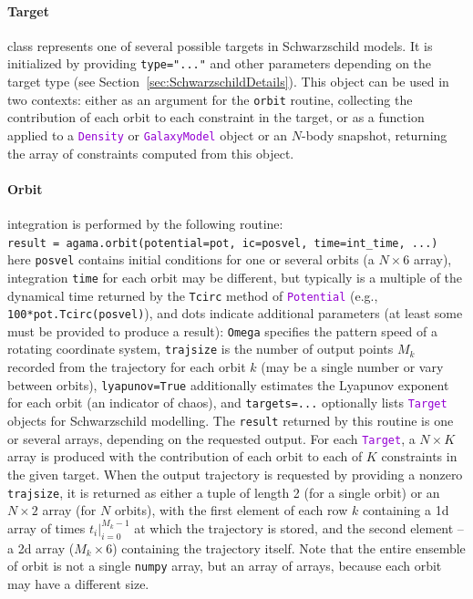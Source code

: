 \documentclass[12pt]{article}
\newcommand{\ttt}[1]{\textcolor{darkviolet}{\texttt{#1}}}
\newcommand{\ppp}[1]{\textcolor{darkolive} {\texttt{#1}}}
\begin{document}
\paragraph{Target} class represents one of several possible targets in Schwarzschild models. It is initialized by providing \ppp{type="..."} and other parameters depending on the target type (see Section~\ref{sec:SchwarzschildDetails}). This object can be used in two contexts: either as an argument for the \texttt{orbit} routine, collecting the contribution of each orbit to each constraint in the target, or as a function applied to a \ttt{Density} or \ttt{GalaxyModel} object or an $N$-body snapshot, returning the array of constraints computed from this object.

\paragraph{Orbit} integration is performed by the following routine:\\
\texttt{result = agama.orbit(potential=pot, ic=posvel, time=int_time, ...)}\\
here \ppp{posvel} contains initial conditions for one or several orbits (a $N\times6$ array), integration \ppp{time} for each orbit may be different, but typically is a multiple of the dynamical time returned by the \texttt{Tcirc} method of \ttt{Potential} (e.g., \texttt{100*pot.Tcirc(posvel)}), and dots indicate additional parameters (at least some must be provided to produce a result): \ppp{Omega} specifies the pattern speed of a rotating coordinate system, \ppp{trajsize} is the number of output points $M_k$ recorded from the trajectory for each orbit $k$ (may be a single number or vary between orbits), \ppp{lyapunov=True} additionally estimates the Lyapunov exponent for each orbit (an indicator of chaos), and \ppp{targets=...} optionally lists \ttt{Target} objects for Schwarzschild modelling.
The \texttt{result} returned by this routine is one or several arrays, depending on the requested output. For each \ttt{Target}, a $N\times K$ array is produced with the contribution of each orbit to each of $K$ constraints in the given target. When the output trajectory is requested by providing a nonzero \ppp{trajsize}, it is returned as either a tuple of length 2 (for a single orbit) or an $N\times 2$ array (for $N$ orbits), with the first element of each row $k$ containing a 1d array of times $t_i |_{i=0}^{M_k-1}$ at which the trajectory is stored, and the second element -- a 2d array ($M_k\times6$) containing the trajectory itself. Note that the entire ensemble of orbit is not a single \texttt{numpy} array, but an array of arrays, because each orbit may have a different size.
\end{document}
